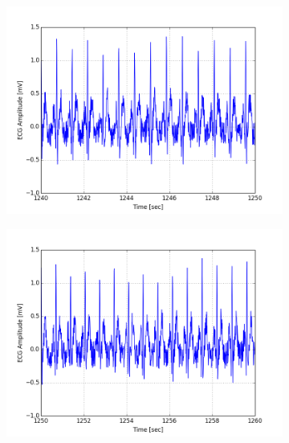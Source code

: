 \documentclass[paper=a4, fontsize=11pt]{scrartcl}
\numberwithin{equation}{section}		%
\numberwithin{figure}{section}			%
\numberwithin{table}{section}		    %
\begin{document}
\begin{appendices}
\begin{figure}[H]
	\centering
	\begin{subfigure}[b]{0.3\textwidth}
		\includegraphics[width=\textwidth]{sim/ecg_31}
	\end{subfigure}
	\begin{subfigure}[b]{0.3\textwidth}
		\includegraphics[width=\textwidth]{sim/ecg_32}
	\end{subfigure}
	\begin{subfigure}[b]{0.3\textwidth}

\end{subfigure}
\end{figure}
\end{appendices}
\end{document}
